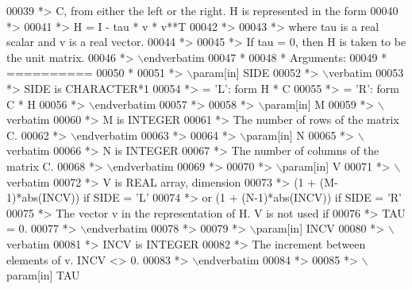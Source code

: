 \begin{DoxyCode}
00039 \textcolor{comment}{*> C, from either the left or the right. H is represented in the form}
00040 \textcolor{comment}{*>}
00041 \textcolor{comment}{*>       H = I - tau * v * v**T}
00042 \textcolor{comment}{*>}
00043 \textcolor{comment}{*> where tau is a real scalar and v is a real vector.}
00044 \textcolor{comment}{*>}
00045 \textcolor{comment}{*> If tau = 0, then H is taken to be the unit matrix.}
00046 \textcolor{comment}{*> \(\backslash\)endverbatim}
00047 \textcolor{comment}{*}
00048 \textcolor{comment}{*  Arguments:}
00049 \textcolor{comment}{*  ==========}
00050 \textcolor{comment}{*}
00051 \textcolor{comment}{*> \(\backslash\)param[in] SIDE}
00052 \textcolor{comment}{*> \(\backslash\)verbatim}
00053 \textcolor{comment}{*>          SIDE is CHARACTER*1}
00054 \textcolor{comment}{*>          = 'L': form  H * C}
00055 \textcolor{comment}{*>          = 'R': form  C * H}
00056 \textcolor{comment}{*> \(\backslash\)endverbatim}
00057 \textcolor{comment}{*>}
00058 \textcolor{comment}{*> \(\backslash\)param[in] M}
00059 \textcolor{comment}{*> \(\backslash\)verbatim}
00060 \textcolor{comment}{*>          M is INTEGER}
00061 \textcolor{comment}{*>          The number of rows of the matrix C.}
00062 \textcolor{comment}{*> \(\backslash\)endverbatim}
00063 \textcolor{comment}{*>}
00064 \textcolor{comment}{*> \(\backslash\)param[in] N}
00065 \textcolor{comment}{*> \(\backslash\)verbatim}
00066 \textcolor{comment}{*>          N is INTEGER}
00067 \textcolor{comment}{*>          The number of columns of the matrix C.}
00068 \textcolor{comment}{*> \(\backslash\)endverbatim}
00069 \textcolor{comment}{*>}
00070 \textcolor{comment}{*> \(\backslash\)param[in] V}
00071 \textcolor{comment}{*> \(\backslash\)verbatim}
00072 \textcolor{comment}{*>          V is REAL array, dimension}
00073 \textcolor{comment}{*>                     (1 + (M-1)*abs(INCV)) if SIDE = 'L'}
00074 \textcolor{comment}{*>                  or (1 + (N-1)*abs(INCV)) if SIDE = 'R'}
00075 \textcolor{comment}{*>          The vector v in the representation of H. V is not used if}
00076 \textcolor{comment}{*>          TAU = 0.}
00077 \textcolor{comment}{*> \(\backslash\)endverbatim}
00078 \textcolor{comment}{*>}
00079 \textcolor{comment}{*> \(\backslash\)param[in] INCV}
00080 \textcolor{comment}{*> \(\backslash\)verbatim}
00081 \textcolor{comment}{*>          INCV is INTEGER}
00082 \textcolor{comment}{*>          The increment between elements of v. INCV <> 0.}
00083 \textcolor{comment}{*> \(\backslash\)endverbatim}
00084 \textcolor{comment}{*>}
00085 \textcolor{comment}{*> \(\backslash\)param[in] TAU}

\end{DoxyCode}

